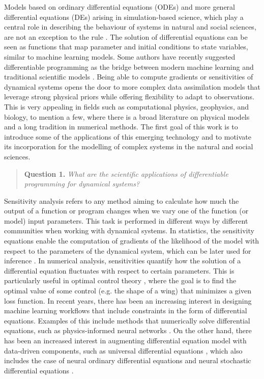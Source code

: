 Models based on ordinary differential equations (ODEs) and more general differential equations (DEs) arising in simulation-based science, which play a central role in describing the behaviour of systems in natural and social sciences, are not an exception to the rule \cite{Ghattas.2021}.
The solution of differential equations can be seen as functions that map parameter and initial conditions to state variables, similar to machine learning models.
Some authors have recently suggested differentiable programming as the bridge between modern machine learning and traditional scientific models \cite{Ramsundar_Krishnamurthy_Viswanathan_2021, Shen_diff_modelling, Gelbrecht-differential-programming-Earth, rackauckas2021generalized}. 
Being able to compute gradients or sensitivities of dynamical systems opens the door to more complex data assimilation models that leverage strong physical priors while offering flexibility to adapt to observations.
This is very appealing in fields such as computational physics, geophysics, and biology, to mention a few, where there is a broad literature on physical models and a long tradition in numerical methods. 
The first goal of this work is to introduce some of the applications of this emerging technology and to motivate its incorporation for the modelling of complex systems in the natural and social sciences. 
\begin{quote}
    \textbf{Question 1. }
    \textit{What are the scientific applications of differentiable programming for dynamical systems?}
\end{quote}

Sensitivity analysis refers to any method aiming to calculate how much the output of a function or program changes when we vary one of the function (or model) input parameters. 
This task is performed in different ways by different communities when working with dynamical systems. 
In statistics, the sensitivity equations enable the computation of gradients of the likelihood of the model with respect to the parameters of the dynamical system, which can be later used for inference \cite{ramsay2017dynamic}. 
In numerical analysis, sensitivities quantify how the solution of a differential equation fluctuates with respect to certain parameters. 
This is particularly useful in optimal control theory \cite{Giles_Pierce_2000}, where the goal is to find the optimal value of some control (e.g. the shape of a wing) that minimizes a given loss function. 
In recent years, there has been an increasing interest in designing machine learning workflows that include constraints in the form of differential equations.
Examples of this include methods that numerically solve differential equations, such as physics-informed neural networks \cite{PINNs_2019}. 
On the other hand, there has been an increased interest in augmenting differential equation model with data-driven components, such as universal differential equations \cite{rackauckas2020universal, Dandekar_2020}, which also includes the case of neural ordinary differential equations \cite{chen_neural_2019} and neural stochastic differential equations \cite{li2020scalable}.

